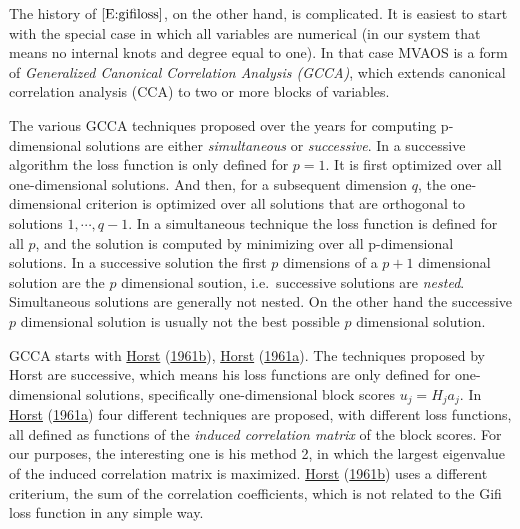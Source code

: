 \documentclass[
  12pt,
]{book}
\begin{document}
The history of \(\eqref{E:gifiloss}\), on the other hand, is complicated. It is easiest to start with the special case in which all variables are numerical (in our system that means no internal knots and degree equal to one). In that case MVAOS is a form of \emph{Generalized Canonical Correlation Analysis (GCCA)}, which extends canonical correlation analysis (CCA) to two or more blocks of variables.

The various GCCA techniques proposed over the years for computing p-dimensional solutions are either \emph{simultaneous} or \emph{successive}. In a successive algorithm the loss function is only defined for \(p=1\). It is first optimized over all one-dimensional solutions. And then, for a subsequent dimension \(q\), the one-dimensional criterion is optimized over all solutions that are orthogonal to solutions \(1,\cdots,q-1\). In a simultaneous technique the loss function is defined for all \(p\), and the solution is computed by minimizing over all p-dimensional solutions. In a successive solution the first \(p\) dimensions of a \(p+1\) dimensional solution are the \(p\) dimensional soution, i.e.~successive solutions are \emph{nested}. Simultaneous solutions are generally not nested. On the other hand the successive \(p\) dimensional solution is usually not the best possible \(p\) dimensional solution.

GCCA starts with \protect\hyperlink{ref-horst_61a}{Horst} (\protect\hyperlink{ref-horst_61a}{1961b}), \protect\hyperlink{ref-horst_61b}{Horst} (\protect\hyperlink{ref-horst_61b}{1961a}). The techniques proposed by Horst are successive, which means his loss
functions are only defined for one-dimensional solutions, specifically one-dimensional block scores \(u_j=H_ja_j\).
In \protect\hyperlink{ref-horst_61b}{Horst} (\protect\hyperlink{ref-horst_61b}{1961a}) four different techniques are proposed, with different loss functions, all defined as functions
of the \emph{induced correlation matrix} of the block scores. For our purposes, the interesting one is his method 2, in which the largest eigenvalue of the induced correlation matrix is maximized. \protect\hyperlink{ref-horst_61a}{Horst} (\protect\hyperlink{ref-horst_61a}{1961b}) uses a different criterium,
the sum of the correlation coefficients, which is not related to the Gifi loss function in any simple way.
\end{document}
